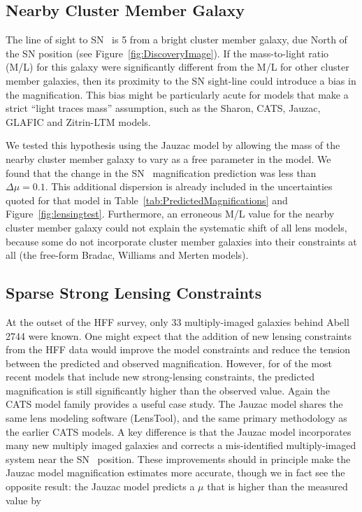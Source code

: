 \subsection{Nearby Cluster Member Galaxy}
\label{sec:NearbyClusterMemberGalaxy}

The line of sight to SN \tomas\ is 5 from a bright cluster
member galaxy, due North of the SN position (see
Figure~\ref{fig:DiscoveryImage}).  If the mass-to-light ratio (M/L)
for this galaxy were significantly different from the M/L for other
cluster member galaxies, then its proximity to the SN sight-line could
introduce a bias in the magnification.  This bias might be
particularly acute for models that make a strict ``light traces mass''
assumption, such as the Sharon, CATS, Jauzac, GLAFIC and Zitrin-LTM
models.  

We tested this hypothesis using the Jauzac model by allowing the mass
of the nearby cluster member galaxy to vary as a free parameter in the
model. We found that the change in the SN \tomas\ magnification
prediction was less than $\Delta\mu=0.1$.  This additional dispersion
is already included in the uncertainties quoted for that model in
Table~\ref{tab:PredictedMagnifications} and
Figure~\ref{fig:lensingtest}.  Furthermore, an erroneous M/L
value for the nearby cluster member galaxy could not explain the
systematic shift of all lens models, because some do not incorporate
cluster member galaxies into their constraints at all (the free-form
Bradac, Williams and Merten models).

\subsection{Sparse Strong Lensing Constraints}
\label{sec:SparseStrongLensingConstraints}

At the outset of the HFF survey, only 33 multiply-imaged galaxies
behind Abell 2744 were known.  One might expect that the addition of
new lensing constraints from the HFF data would improve the model
constraints and reduce the tension between the predicted and observed
magnification.  However, for  of the most recent
models \citep{Jauzac:2014c,Lam:2014} that include new strong-lensing
constraints, the predicted magnification is still significantly higher
than the observed value.  Again the CATS model family provides a
useful case study.  The Jauzac model shares the same lens modeling
software (LensTool), and the same primary methodology as the earlier
CATS models.  A key difference is that the Jauzac model incorporates
many new multiply imaged galaxies and corrects a mis-identified
multiply-imaged system near the SN \tomas\ position.  These
improvements should in principle make the Jauzac model magnification
estimates more accurate, though we in fact see the opposite result:
the Jauzac model predicts a $\mu$ that is higher than the measured
value by 

